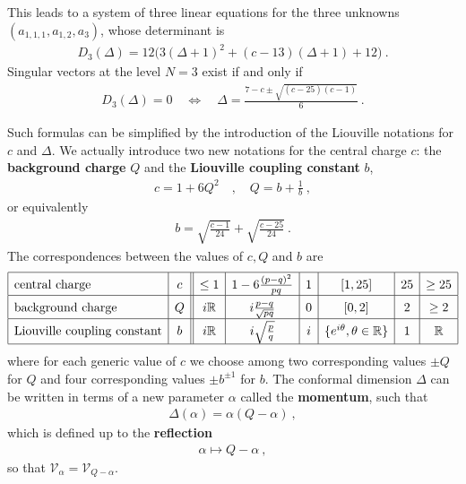 \documentclass[12pt,a4paper,notitlepage]{report}
\numberwithin{equation}{section}
\theoremstyle{break}
\begin{document}
This leads to a system of three linear equations for the three unknowns $(a_{1,1,1},a_{1,2},a_3)$, whose determinant is
\begin{align}
 D_3(\Delta) = 12\Big(3(\Delta+1)^2+(c-13)(\Delta+1)+12\Big)\ .
\end{align}
Singular vectors at the level $N=3$ exist if and only if 
\begin{align}
 D_3(\Delta) = 0 \quad \Leftrightarrow \quad \Delta = \frac{7-c\pm\sqrt{(c-25)(c-1)}}{6}\ .
\end{align}

Such formulas can be simplified by the introduction of the Liouville notations for $c$ and $\Delta$.
We actually introduce two new notations for the central charge $c$: the \textbf{\boldmath background charge} $Q$ and the \textbf{\boldmath Liouville coupling constant} $b$,
\begin{align}
\boxed{ c= 1+6Q^2 }\quad , \quad \boxed{Q = b+\frac{1}{b}}\ ,
\label{cqb}
\end{align}
or equivalently
\begin{align}
 b = \sqrt{\frac{c-1}{24}} + \sqrt{\frac{c-25}{24}}\ .
\end{align}
The correspondences between the values of $c,Q$ and $b$ are 
\begin{align}
\renewcommand{\arraystretch}{1.5}
 \begin{array}{|l|c||c|c|c|c|c|c|}
  \hline
  \text{central\ charge} & c & \leq 1 & 1-6\frac{(p-q)^2}{pq} & 1 & [1,25] & 25 & \geq 25 
\\
\hline
\text{background\ charge} & Q & i{\mathbb{R}} & i\frac{p-q}{\sqrt{pq}} & 0 & [0,2] & 2 & \geq 2 
\\
\hline
\text{Liouville\ coupling\ constant} &
b& i{\mathbb{R}} & i\sqrt{\frac{p}{q}} & i & \{e^{i\theta},\theta\in{\mathbb{R}}\} & 1 & {\mathbb{R}}
\\
\hline
 \end{array}
\label{cqbval}
\end{align}
where for each generic value of $c$ we choose among two corresponding values $\pm Q$ for $Q$ and four corresponding values $\pm b^{\pm 1}$ for $b$.
The conformal dimension $\Delta$ can be written in terms of a 
new parameter $\alpha$ called the \textbf{\boldmath momentum}, such that 
\begin{align}
 \boxed{\Delta(\alpha) = \alpha(Q-\alpha)}\ ,
\label{daq}
\end{align}
which is defined up to the \textbf{\boldmath reflection}
\begin{align}
 \alpha \mapsto Q-\alpha\ ,
\label{arqa}
\end{align}
so that $\mathcal{V}_\alpha = \mathcal{V}_{Q-\alpha}$.
\end{document}
